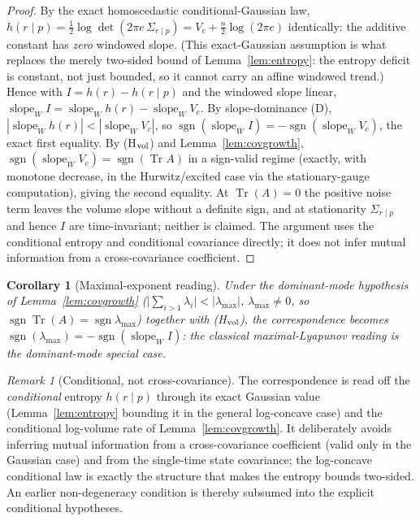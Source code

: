 \documentclass[11pt]{article}
\theoremstyle{plain}
\newtheorem{corollary}[theorem]{Corollary}
\theoremstyle{definition}
\theoremstyle{remark}
\newtheorem{remark}[theorem]{Remark}
\begin{document}
\begin{proof}
By the exact homoscedastic conditional-Gaussian law, $h(r\mid p)=\tfrac12\log\det(2\pi e\,\Sigma_{r\mid p})=V_c+\tfrac n2\log(2\pi e)$ identically: the additive constant has \emph{zero} windowed slope. (This exact-Gaussian assumption is what replaces the merely two-sided bound of Lemma~\ref{lem:entropy}: the entropy deficit is constant, not just bounded, so it cannot carry an affine windowed trend.) Hence with $I=h(r)-h(r\mid p)$ and the windowed slope linear, $\operatorname{slope}_W I=\operatorname{slope}_W h(r)-\operatorname{slope}_W V_c$. By slope-dominance (D), $|\operatorname{slope}_W h(r)|<|\operatorname{slope}_W V_c|$, so $\operatorname{sgn}(\operatorname{slope}_W I)=-\operatorname{sgn}(\operatorname{slope}_W V_c)$, the exact first equality. By (H$_{\rm vol}$) and Lemma~\ref{lem:covgrowth}, $\operatorname{sgn}(\operatorname{slope}_W V_c)=\operatorname{sgn}(\operatorname{Tr}A)$ in a sign-valid regime (exactly, with monotone decrease, in the Hurwitz/excited case via the stationary-gauge computation), giving the second equality. At $\operatorname{Tr}(A)=0$ the positive noise term leaves the volume slope without a definite sign, and at stationarity $\Sigma_{r\mid p}$ and hence $I$ are time-invariant; neither is claimed. The argument uses the conditional entropy and conditional covariance directly; it does not infer mutual information from a cross-covariance coefficient.
\end{proof}

\begin{corollary}[Maximal-exponent reading]\label{cor:t1lyap}
Under the dominant-mode hypothesis of Lemma~\ref{lem:covgrowth} ($\big|\sum_{i>1}\lambda_i\big|<|\lambda_{\max}|$, $\lambda_{\max}\neq0$, so $\operatorname{sgn}\operatorname{Tr}(A)=\operatorname{sgn}\lambda_{\max}$) together with (H$_{\rm vol}$), the correspondence becomes $\operatorname{sgn}(\lambda_{\max})=-\operatorname{sgn}(\operatorname{slope}_W I)$: the classical maximal-Lyapunov reading is the dominant-mode special case.
\end{corollary}

\begin{remark}[Conditional, not cross-covariance]\label{rem:t1deg}
The correspondence is read off the \emph{conditional} entropy $h(r\mid p)$ through its exact Gaussian value (Lemma~\ref{lem:entropy} bounding it in the general log-concave case) and the conditional log-volume rate of Lemma~\ref{lem:covgrowth}. It deliberately avoids inferring mutual information from a cross-covariance coefficient (valid only in the Gaussian case) and from the single-time state covariance; the log-concave conditional law is exactly the structure that makes the entropy bounds two-sided. An earlier non-degeneracy condition is thereby subsumed into the explicit conditional hypotheses.
\end{remark}
\end{document}
